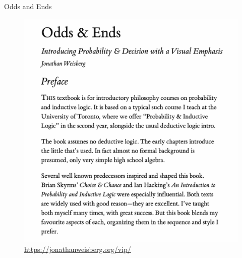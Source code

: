 \documentclass[ignorenonframetext,]{beamer}
\renewcommand{\,}{\text{, }}
\begin{document}
\begin{frame}{Odds and Ends}
\protect\hypertarget{odds-and-ends}{}

\begin{figure}
\centering
\includegraphics[width=\textwidth,height=0.8\textheight]{images/0_1_a_Odds_and_Ends.png}
\caption{\url{https://jonathanweisberg.org/vip/}}
\end{figure}

\end{frame}
\end{document}
